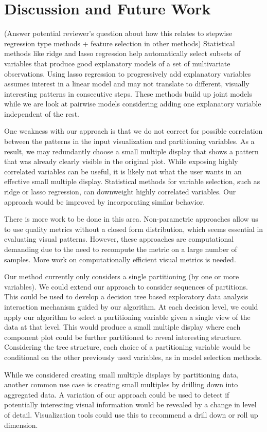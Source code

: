 \section{Discussion and Future Work}
\label{sec:discussion}
(Answer potential reviewer's question about how this relates to stepwise regression type methods + feature selection in other methods)
Statistical methods like ridge and lasso regression help automatically select subsets of variables that produce good explanatory models of a set of multivariate observations. Using lasso regression to progressively add explanatory variables assumes interest in a linear model and may not translate to different, visually interesting  patterns in consecutive steps. These methods build up joint models while we are look at pairwise models considering adding one explanatory variable independent of the rest. 

One weakness with our approach is that we do not correct for possible correlation between the patterns in the input visualization and partitioning variables. As a result, we may redundantly choose a small multiple display that shows a pattern that was already clearly visible in the original plot. While exposing highly correlated variables can be useful, it is likely not what the user wants in an effective small multiple display. Statistical methods for variable selection, such as ridge or lasso regression, can downweight highly correlated variables. Our approach would be improved by incorporating similar behavior. 

There is more work to be done in this area. Non-parametric approaches allow us to use quality metrics without a closed form distribution, which seems essential in evaluating visual patterns. However, these approaches are computational demanding due to the need to recompute the metric on a large number of samples. More work on computationally efficient visual metrics is needed.

Our method currently only considers a single partitioning (by one or more variables). We could extend our approach to consider sequences of partitions. This could be used to develop a decision tree based exploratory data analysis interaction mechanism guided by our algorithm. At each decision level, we could apply our algorithm to select a partitioning variable given a single view of the data at that level. This would produce a small multiple display where each component plot could be further partitioned to reveal interesting structure. Considering the tree structure, each choice of a partitioning variable would be conditional on the other previously used variables, as in model selection methods. 

While we considered creating small multiple displays by partitioning data, another common use case is creating small multiples by drilling down into aggregated data. A variation of our approach could be used to detect if potentially interesting visual information would be revealed by a change in level of detail. Visualization tools could use this to recommend a drill down or roll up dimension.

